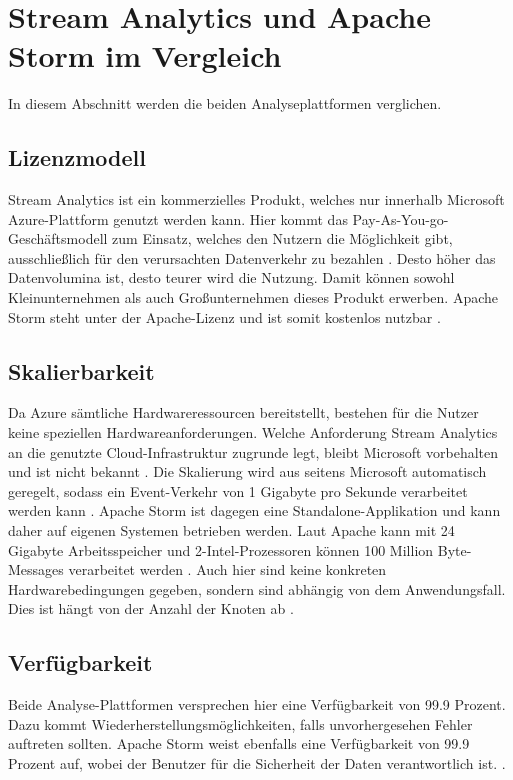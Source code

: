 \section{Stream Analytics und Apache Storm im Vergleich}
In diesem Abschnitt werden die beiden Analyseplattformen verglichen. 


\subsection{Lizenzmodell}
Stream Analytics ist ein kommerzielles Produkt, welches nur innerhalb Microsoft Azure-Plattform genutzt werden kann. Hier kommt das Pay-As-You-go-Geschäftsmodell zum Einsatz, welches den Nutzern die Möglichkeit gibt, ausschließlich für den verursachten Datenverkehr zu bezahlen \cite{Pricing.2017}. Desto höher das Datenvolumina ist, desto teurer wird die Nutzung. Damit können sowohl Kleinunternehmen als auch Großunternehmen dieses Produkt erwerben. Apache Storm steht unter der Apache-Lizenz und ist somit kostenlos nutzbar \cite{lizenz.2004}. 

\subsection{Skalierbarkeit}
Da Azure sämtliche Hardwareressourcen bereitstellt, bestehen für die Nutzer keine speziellen Hardwareanforderungen. Welche Anforderung Stream Analytics an die genutzte Cloud-Infrastruktur zugrunde legt, bleibt Microsoft vorbehalten und ist nicht bekannt \cite{samacha.2017}. Die Skalierung wird aus seitens Microsoft automatisch geregelt, sodass ein Event-Verkehr von 1 Gigabyte pro Sekunde verarbeitet werden kann \cite{samacha.19.12.2017b}. Apache Storm ist dagegen eine Standalone-Applikation und kann daher auf eigenen Systemen betrieben werden. Laut Apache kann mit 24 Gigabyte Arbeitsspeicher und 2-Intel-Prozessoren können 100 Million Byte-Messages verarbeitet werden \cite{apachescale.2017}. Auch hier sind keine konkreten Hardwarebedingungen gegeben, sondern sind abhängig von dem Anwendungsfall. Dies ist hängt von der Anzahl der Knoten ab \cite{samacha.2017}.


\subsection{Verfügbarkeit}
Beide Analyse-Plattformen versprechen hier eine Verfügbarkeit von 99.9 Prozent. Dazu kommt Wiederherstellungsmöglichkeiten, falls unvorhergesehen Fehler auftreten sollten. Apache Storm weist ebenfalls eine Verfügbarkeit von 99.9 Prozent auf, wobei der Benutzer für die Sicherheit der Daten verantwortlich ist. \cite{samacha.2017}. 

